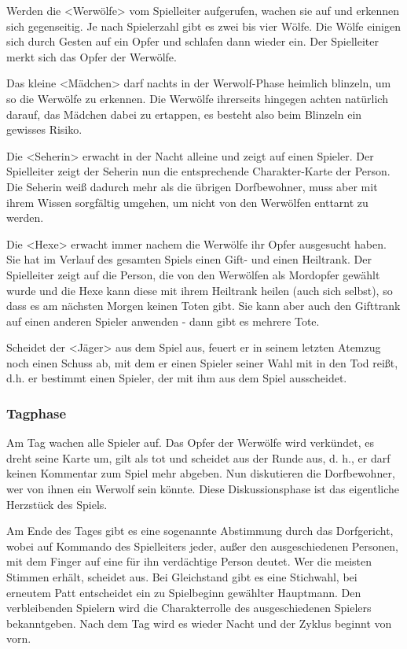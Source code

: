 \documentclass[12pt]{article}
\begin{document}
Werden die <Werwölfe> vom Spielleiter aufgerufen, wachen sie auf und erkennen sich gegenseitig.
Je nach Spielerzahl gibt es zwei bis vier Wölfe.
Die Wölfe einigen sich durch Gesten auf ein Opfer und schlafen dann wieder ein.
Der Spielleiter merkt sich das Opfer der Werwölfe.

Das kleine <Mädchen> darf nachts in der Werwolf-Phase heimlich blinzeln, um so die Werwölfe zu
erkennen. Die Werwölfe ihrerseits hingegen achten natürlich darauf, das Mädchen dabei zu ertappen,
es besteht also beim Blinzeln ein gewisses Risiko.

Die <Seherin> erwacht in der Nacht alleine und zeigt auf einen Spieler.
Der Spielleiter zeigt der Seherin nun die entsprechende Charakter-Karte der Person.
Die Seherin weiß dadurch mehr als die übrigen Dorfbewohner, muss aber mit ihrem Wissen
sorgfältig umgehen, um nicht von den Werwölfen enttarnt zu werden.

Die <Hexe> erwacht immer nachem die Werwölfe ihr Opfer ausgesucht haben.
Sie hat im Verlauf des gesamten Spiels einen Gift- und einen Heiltrank.
Der Spielleiter zeigt auf die Person, die von den Werwölfen als Mordopfer gewählt wurde und die
Hexe kann diese mit ihrem Heiltrank heilen (auch sich selbst), so dass es am nächsten Morgen keinen
Toten gibt. Sie kann aber auch den Gifttrank auf einen anderen Spieler anwenden -
dann gibt es mehrere Tote.

Scheidet der <Jäger> aus dem Spiel aus, feuert er in seinem letzten Atemzug noch einen Schuss ab,
mit dem er einen Spieler seiner Wahl mit in den Tod reißt, d.h. er bestimmt einen Spieler,
der mit ihm aus dem Spiel ausscheidet.

\subsubsection{Tagphase}
Am Tag wachen alle Spieler auf. Das Opfer der Werwölfe wird verkündet, es dreht seine Karte um,
gilt als tot und scheidet aus der Runde aus, d. h., er darf keinen Kommentar zum Spiel mehr abgeben.
Nun diskutieren die Dorfbewohner, wer von ihnen ein Werwolf sein könnte. Diese Diskussionsphase
ist das eigentliche Herzstück des Spiels.

Am Ende des Tages gibt es eine sogenannte Abstimmung durch das Dorfgericht, wobei auf Kommando des
Spielleiters jeder, außer den ausgeschiedenen Personen, mit dem Finger auf eine für ihn verdächtige
Person deutet. Wer die meisten Stimmen erhält, scheidet aus. Bei Gleichstand gibt es eine Stichwahl,
bei erneutem Patt entscheidet ein zu Spielbeginn gewählter Hauptmann. Den verbleibenden Spielern
wird die Charakterrolle des ausgeschiedenen Spielers bekanntgeben. Nach dem Tag wird es wieder
Nacht und der Zyklus beginnt von vorn.
\end{document}
